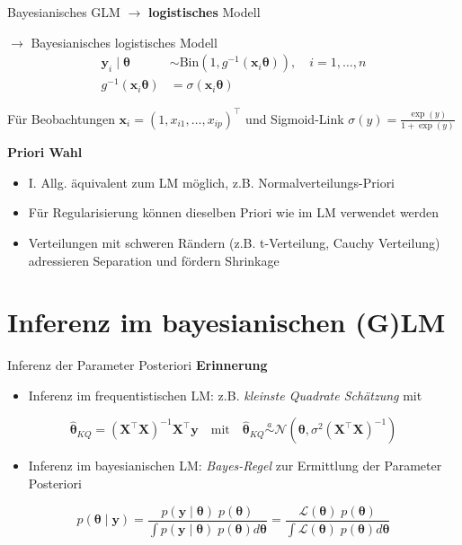 \documentclass[
  ignorenonframetext,
  aspectratio=169,
]{beamer}
\providecommand{\tightlist}{%
  \setlength{\itemsep}{0pt}\setlength{\parskip}{0pt}}
\newcommand{\bx}{\bm{x}}
\newcommand{\by}{\bm{y}}
\newcommand{\bX}{\bm{X}}
\newcommand{\Lcal}{\mathcal{L}}
\newcommand{\Ncal}{\mathcal{N}}
\newcommand{\ssd}{\sigma^2}
\newcommand{\btheta}{\bm{\theta}}
\newcommand{\hbtheta}{\hat{\bm{\theta}}}
\begin{document}
\begin{frame}{Bayesianisches GLM \(\to\) \textbf{logistisches} Modell}
\protect{}\label{bayesianisches-glm-to-logistisches-modell}
\begin{block}{\(\to\) Bayesianisches logistisches Modell}
\protect{}\label{to-bayesianisches-logistisches-modell}
\[
\begin{aligned}
  \by_i \mid \btheta &\sim \text{Bin}(1, g^{-1}(\bx_i \btheta)), \quad i = 1, \dots, n \\
  g^{-1}(\bx_i \btheta) &= \sigma(\bx_i \btheta)
\end{aligned}
\]

Für Beobachtungen \(\bx_i = (1, x_{i1}, \dots, x_{ip})^\top\) und
Sigmoid-Link \(\sigma(y) = \frac{\exp(y)}{1 + \exp(y)}\)
\end{block}

\textbf{Priori Wahl}

\begin{itemize}
\tightlist
\item
  I. Allg. äquivalent zum LM möglich, z.B. Normalverteilungs-Priori
\item
  Für Regularisierung können dieselben Priori wie im LM verwendet werden
  \autocite{ohara_review_2009,fahrmeir_bayesian_2010,van_erp_shrinkage_2019}
\item
  Verteilungen mit schweren Rändern (z.B. t-Verteilung, Cauchy
  Verteilung) adressieren Separation und fördern Shrinkage
  \autocite{gelman_weakly_2008,ghosh_use_2017}
\end{itemize}
\end{frame}

\section{Inferenz im bayesianischen
(G)LM}\label{inferenz-im-bayesianischen-glm}

\begin{frame}{Inferenz der Parameter Posteriori}
\protect{}\label{inferenz-der-parameter-posteriori}
\textbf{Erinnerung}

\begin{itemize}
\tightlist
\item
  Inferenz im frequentistischen LM: z.B. \emph{kleinste Quadrate
  Schätzung} mit
\end{itemize}

\[
\hbtheta_{KQ} = (\bX^\top \bX)^{-1} \bX^\top \by \quad \text{mit} \quad \hbtheta_{KQ} \overset{a}{\sim} \Ncal(\btheta, \ssd (\bX^\top \bX)^{-1})
\]

\begin{itemize}
\tightlist
\item
  Inferenz im bayesianischen LM: \emph{Bayes-Regel} zur Ermittlung der
  Parameter Posteriori
\end{itemize}

\[
p(\btheta \mid \by) = \frac{p(\by \mid \btheta) \; p(\btheta)}{\int p(\by \mid \btheta) \; p(\btheta) d \btheta}
= \frac{\Lcal(\btheta) \; p(\btheta)}{\int \Lcal(\btheta) \; p(\btheta) d \btheta}
\]
\end{frame}
\end{document}
